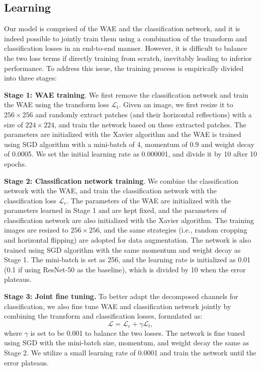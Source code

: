 \documentclass[letterpaper]{article} %
\begin{document}
\subsection{Learning}
Our model is comprised of the WAE and the classification network, and it is indeed possible to jointly train them using a combination of the transform and classification losses in an end-to-end manner. However, it is difficult to balance the two loss terms if directly training from scratch, inevitably leading to inferior performance. To address this issue, the training process is empirically divided into three stages:

\noindent\textbf{Stage 1: WAE training}. We first remove the classification network and train the WAE using the transform loss $\mathcal{L}_t$. Given an image, we first resize it to $256 \times 256$ and randomly extract patches (and their horizontal reflections) with a size of $224 \times 224$, and train the network based on these extracted patches. The parameters are  initialized with the Xavier algorithm \cite{glorot2010understanding} and the WAE is trained using SGD algorithm with a mini-batch of 4, momentum of 0.9 and weight decay of 0.0005. We set the initial learning rate as 0.000001, and divide it by 10 after 10 epochs.

\noindent\textbf{Stage 2: Classification network training}. We combine the classification network with the WAE, and train the classification network with the classification loss $\mathcal{L}_{{c}}$. The parameters of the WAE are initialized with the parameters learned in Stage 1 and are kept fixed, and the parameters of classification network are also initialized with the Xavier algorithm. The training images are resized to $256 \times 256$, and the same strategies (i.e., random cropping and horizontal flipping) are adopted for data augmentation. The network is also trained using SGD algorithm with the same momentum and weight decay as Stage 1. The mini-batch is set as 256, and the learning rate is initialized as 0.01 (0.1 if using ResNet-50 as the baseline), which is divided by 10 when the error plateaus.

\noindent\textbf{Stage 3: Joint fine tuning.} To better adapt the decomposed channels for classification, we also fine tune WAE and classification network jointly by combining the transform and classification losses, formulated as:
 \begin{equation}
      \mathcal{L}=\mathcal{L}_c+\gamma\mathcal{L}_t,
\end{equation}
where $\gamma$ is set to be 0.001 to balance the two losses. The network is fine tuned using SGD with the mini-batch size, momentum, and weight decay the same as Stage 2. We utilize a small learning rate of 0.0001 and train the network until the error plateaus.
\end{document}
